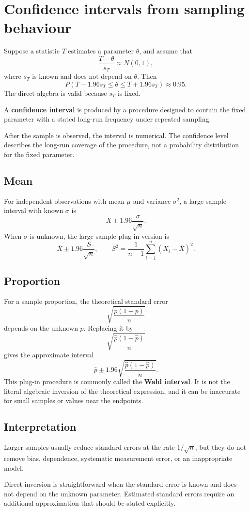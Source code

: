 \section{Confidence intervals from sampling behaviour}

Suppose a statistic \(T\) estimates a parameter \(\theta\), and assume that
\[
\frac{T-\theta}{s_T}\approx N(0,1),
\]
where \(s_T\) is known and does not depend on \(\theta\). Then
\[
P\left(T-1.96s_T\leq\theta\leq T+1.96s_T\right)\approx0.95.
\]
The direct algebra is valid because \(s_T\) is fixed.

\begin{definitionbox}
A \textbf{confidence interval} is produced by a procedure designed to contain the
fixed parameter with a stated long-run frequency under repeated sampling.
\end{definitionbox}

After the sample is observed, the interval is numerical. The confidence level
describes the long-run coverage of the procedure, not a probability distribution
for the fixed parameter.

\subsection*{Mean}

For independent observations with mean \(\mu\) and variance \(\sigma^2\), a
large-sample interval with known \(\sigma\) is
\[
\overline X\pm1.96\frac{\sigma}{\sqrt n}.
\]
When \(\sigma\) is unknown, the large-sample plug-in version is
\[
\overline X\pm1.96\frac{S}{\sqrt n},
\qquad
S^2=\frac1{n-1}\sum_{i=1}^n(X_i-\overline X)^2.
\]

\subsection*{Proportion}

For a sample proportion, the theoretical standard error
\[
\sqrt{\frac{p(1-p)}{n}}
\]
depends on the unknown \(p\). Replacing it by
\[
\sqrt{\frac{\widehat p(1-\widehat p)}{n}}
\]
gives the approximate interval
\[
\widehat p\pm1.96\sqrt{\frac{\widehat p(1-\widehat p)}{n}}.
\]
This plug-in procedure is commonly called the \textbf{Wald interval}. It is not
the literal algebraic inversion of the theoretical expression, and it can be
inaccurate for small samples or values near the endpoints.

\subsection*{Interpretation}

Larger samples usually reduce standard errors at the rate \(1/\sqrt n\), but they
do not remove bias, dependence, systematic measurement error, or an inappropriate
model.

\begin{summarybox}
Direct inversion is straightforward when the standard error is known and does
not depend on the unknown parameter. Estimated standard errors require an
additional approximation that should be stated explicitly.
\end{summarybox}
